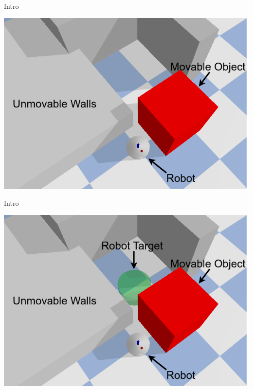 \begin{frame}[fragile]{Intro}
\vspace{-0.7cm}
\begin{center}
\includegraphics[height=0.9\textheight]{figures/introduction/robot_no_target_with_arrows}
\end{center}
\end{frame}

\begin{frame}[fragile]{Intro}
\vspace{-0.7cm}
\begin{center}
\includegraphics[height=0.9\textheight]{figures/introduction/robot_with_target}
\end{center}
\end{frame}


